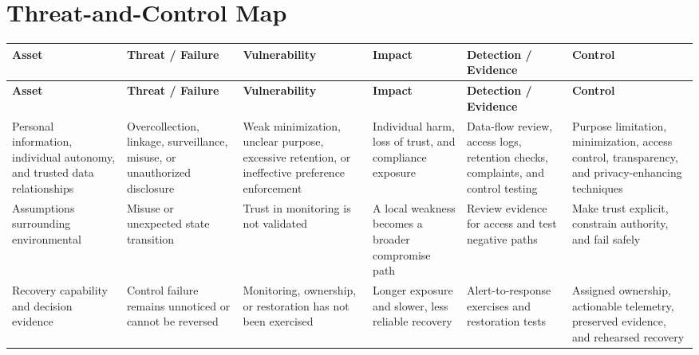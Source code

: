 \documentclass[11pt,letterpaper]{article}
\begin{document}
\section*{Threat-and-Control Map}
\begingroup\scriptsize\setlength{\tabcolsep}{2pt}
\begin{longtable}{>{\raggedright\arraybackslash}p{}>{\raggedright\arraybackslash}p{}>{\raggedright\arraybackslash}p{}>{\raggedright\arraybackslash}p{}>{\raggedright\arraybackslash}p{}>{\raggedright\arraybackslash}p{}}
\toprule\rowcolor{Navy}\color{white}\textbf{Asset} & \color{white}\textbf{Threat / Failure} & \color{white}\textbf{Vulnerability} & \color{white}\textbf{Impact} & \color{white}\textbf{Detection / Evidence} & \color{white}\textbf{Control}\\\midrule
\endfirsthead
\toprule\rowcolor{Navy}\color{white}\textbf{Asset} & \color{white}\textbf{Threat / Failure} & \color{white}\textbf{Vulnerability} & \color{white}\textbf{Impact} & \color{white}\textbf{Detection / Evidence} & \color{white}\textbf{Control}\\\midrule
\endhead
Personal information, individual autonomy, and trusted data relationships & Overcollection, linkage, surveillance, misuse, or unauthorized disclosure & Weak minimization, unclear purpose, excessive retention, or ineffective preference enforcement & Individual harm, loss of trust, and compliance exposure & Data-flow review, access logs, retention checks, complaints, and control testing & Purpose limitation, minimization, access control, transparency, and privacy-enhancing techniques\\\midrule
Assumptions surrounding environmental & Misuse or unexpected state transition & Trust in monitoring is not validated & A local weakness becomes a broader compromise path & Review evidence for access and test negative paths & Make trust explicit, constrain authority, and fail safely\\\midrule
Recovery capability and decision evidence & Control failure remains unnoticed or cannot be reversed & Monitoring, ownership, or restoration has not been exercised & Longer exposure and slower, less reliable recovery & Alert-to-response exercises and restoration tests & Assigned ownership, actionable telemetry, preserved evidence, and rehearsed recovery\\\midrule
\bottomrule
\end{longtable}
\endgroup
\end{document}
